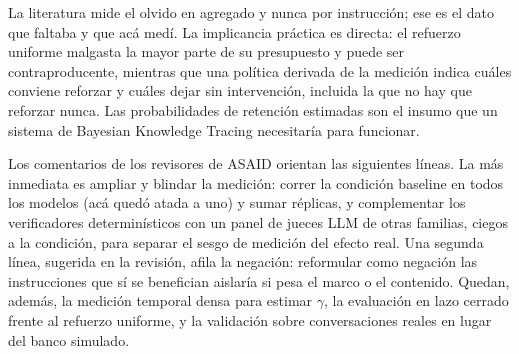 \documentclass[12pt]{article}
\begin{document}
La literatura mide el olvido en agregado y nunca por instrucción; ese es el dato
que faltaba y que acá medí. La implicancia práctica es directa: el refuerzo
uniforme malgasta la mayor parte de su presupuesto y puede ser contraproducente,
mientras que una política derivada de la medición indica cuáles conviene reforzar y
cuáles dejar sin intervención, incluida la que no hay que reforzar nunca. Las
probabilidades de retención estimadas son el insumo que un sistema de Bayesian
Knowledge Tracing necesitaría para funcionar.

Los comentarios de los revisores de ASAID orientan las siguientes líneas. La más
inmediata es ampliar y blindar la medición: correr la condición baseline en todos
los modelos (acá quedó atada a uno) y sumar réplicas, y complementar los
verificadores determinísticos con un panel de jueces LLM de otras familias, ciegos
a la condición, para separar el sesgo de medición del efecto real. Una segunda
línea, sugerida en la revisión, afila la negación: reformular como negación las
instrucciones que sí se benefician aislaría si pesa el marco o el contenido.
Quedan, además, la medición temporal densa para estimar $\gamma$, la evaluación en
lazo cerrado frente al refuerzo uniforme, y la validación sobre conversaciones
reales en lugar del banco simulado.
\end{document}
